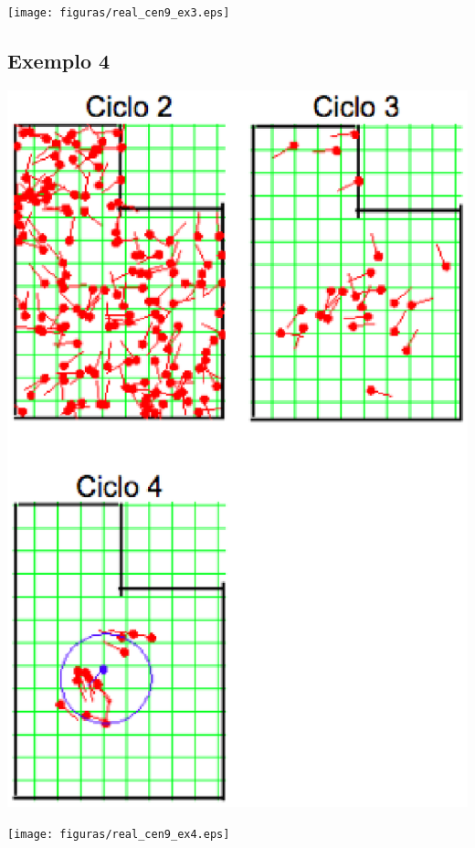 {\centering
\texttt{[image: figuras/real\_cen9\_ex3.eps]}
\label{img:real_cen9_ex3}
\par}

\subsection{Exemplo 4}

{\centering
\includegraphics[scale=0.4]{figuras/cen9_ex4.eps}
\label{img:cen9_ex4}
\par}

{\centering
\texttt{[image: figuras/real\_cen9\_ex4.eps]}
\label{img:real_cen9_ex4}
\par}

